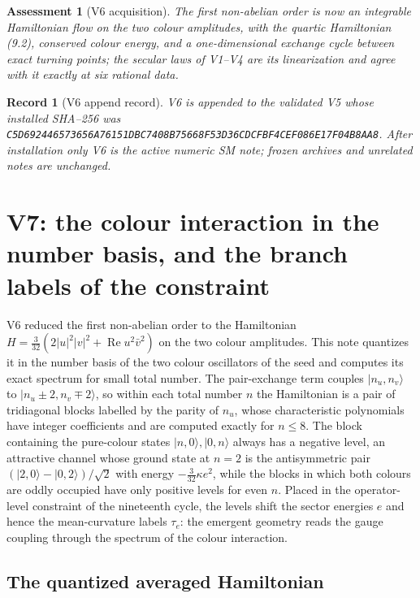\documentclass[11pt]{article}
\newtheorem{assessment}[theorem]{Assessment}
\newtheorem{record}[theorem]{Record}
\theoremstyle{remark}
\begin{document}
\begin{assessment}[V6 acquisition]
\label{ass:v20v6}
The first non-abelian order is now an integrable Hamiltonian flow on
the two colour amplitudes, with the quartic Hamiltonian (9.2),
conserved colour energy, and a one-dimensional exchange cycle between
exact turning points; the secular laws of V1--V4 are its linearization
and agree with it exactly at six rational data.
\end{assessment}

\begin{record}[V6 append record]
\label{rec:v20v6}
V6 is appended to the validated V5 whose installed SHA--256 was
\texttt{C5D692446573656A76151DBC7408B75668F53D36CDCFBF4CEF086E17F04B8AA8}.
After installation only V6 is the active numeric SM note; frozen
archives and unrelated notes are unchanged.
\end{record}


\section{V7: the colour interaction in the number basis, and the branch labels of the constraint}
\label{sec:v20v7}

V6 reduced the first non-abelian order to the Hamiltonian
\(H=\tfrac3{32}(2|u|^2|v|^2+\operatorname{Re}u^2\bar v^2)\) on the two
colour amplitudes.  This note quantizes it in the number basis of the
two colour oscillators of the seed and computes its exact spectrum
for small total number.  The pair-exchange term couples
\(|n_u,n_v\rangle\) to \(|n_u\pm2,n_v\mp2\rangle\), so within each total
number \(n\) the Hamiltonian is a pair of tridiagonal blocks labelled
by the parity of \(n_u\), whose characteristic polynomials have
integer coefficients and are computed exactly for \(n\leq8\).  The
block containing the pure-colour states \(|n,0\rangle,|0,n\rangle\)
always has a negative level, an attractive channel whose ground
state at \(n=2\) is the antisymmetric pair \((|2,0\rangle-|0,2\rangle)/\sqrt2\)
with energy \(-\tfrac3{32}\kappa e^2\), while the blocks in which both
colours are oddly occupied have only positive levels for even \(n\).
Placed in the operator-level constraint of the nineteenth cycle, the
levels shift the sector energies \(e\) and hence the mean-curvature
labels \(\tau_e\): the emergent geometry reads the gauge coupling
through the spectrum of the colour interaction.

\subsection{The quantized averaged Hamiltonian}
\end{document}
